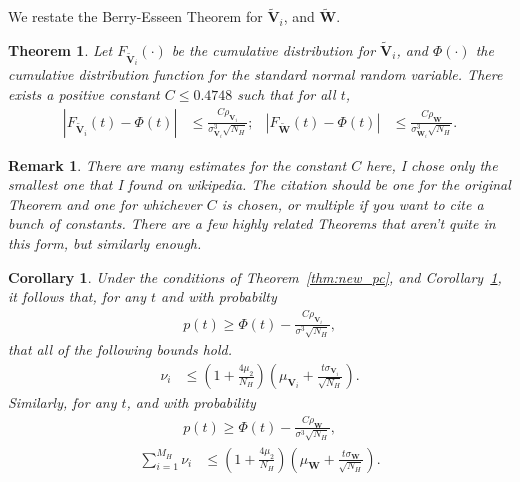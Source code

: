 \documentclass{report}
\newtheorem{thm}{Theorem}[section]
\newtheorem{cor}{Corollary}
\newtheorem{remark}{Remark}[section]
\begin{document}
We restate the Berry-Esseen Theorem for $\tilde{\bm{V}}_i$, and $\tilde{\bm{W}}$.
\begin{thm}
 Let $F_{\tilde{\bm{V}}_i}(\cdot)$ be the cumulative distribution for $\tilde{\bm{V}}_i$, and $\Phi(\cdot)$ the cumulative distribution function for the standard normal random variable. There exists a positive constant $C\le 0.4748$ such that for all $t$,
 \begin{align}
 |F_{\tilde{\bm{V}}_i}(t) - \Phi(t)| &\le \frac{C\rho_{\bm{V}_i}}{\sigma^3_{\bm{V}_{i}}\sqrt{N_H}}; &  |F_{\tilde{\bm{W}}}(t) - \Phi(t)| &\le \frac{C\rho_{\bm{W}}}{\sigma^3_{\bm{W}_{i}}\sqrt{N_H}}.
 \end{align} 
\end{thm}
\begin{remark}
 There are many estimates for the constant $C$ here, I chose only the smallest one that I found on wikipedia. The citation should be one for the original Theorem and one for whichever $C$ is chosen, or multiple if you want to cite a bunch of constants. There are a few highly related Theorems that aren't quite in this form, but similarly enough.
\end{remark}
\begin{cor}
\label{cor:cor2}
Under the conditions of Theorem~\ref{thm:new_pc}, and Corollary~\ref{cor:cor2}, it follows that, for any $t$ and with probabilty 
\begin{align}
p(t) \ge \Phi(t) - \frac{C\rho_{\bm{V}_i}}{\sigma^3\sqrt{N_H}},
\label{eq:prob_vector}
\end{align}
that all of the following bounds hold.
\begin{align}
 \nu_i &\le \left(1+\frac{4\mu_2}{N_H}\right)\left(\mu_{\bm{V}_i} + \frac{t\sigma_{\bm{V}_i}}{\sqrt{N_H}}\right).
 \label{eq:bound_vector}
\end{align}
Similarly, for any $t$, and with probability
\begin{align}
p(t) \ge \Phi(t) - \frac{C\rho_{\bm{W}}}{\sigma^3\sqrt{N_H}},
\label{eq:prob_sum}
\end{align}
\begin{align}
 \mathop{\sum}\limits_{i=1}^{M_H}\nu_i &\le \left(1+\frac{4\mu_2}{N_H}\right)\left(\mu_{\bm{W}} + \frac{t\sigma_{\bm{W}}}{\sqrt{N_H}}\right).
 \label{eq:bound_sum}
\end{align}
\end{cor}
\end{document}
